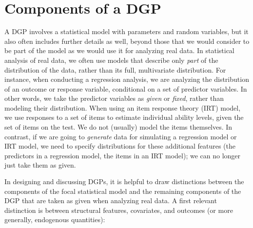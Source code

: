 \documentclass[
]{book}
\begin{document}
\section{Components of a DGP}\label{components-of-a-dgp}

A DGP involves a statistical model with parameters and random variables, but it also often includes further details as well, beyond those that we would consider to be part of the model as we would use it for analyzing real data.
In statistical analysis of real data, we often use models that describe only \emph{part} of the distribution of the data, rather than its full, multivariate distribution.
For instance, when conducting a regression analysis, we are analyzing the distribution of an outcome or response variable, conditional on a set of predictor variables.
In other words, we take the predictor variables as \emph{given} or \emph{fixed}, rather than modeling their distribution.
When using an item response theory (IRT) model, we use responses to a set of items to estimate individual ability levels, given the set of items on the test.
We do not (usually) model the items themselves.
In contrast, if we are going to \emph{generate} data for simulating a regression model or IRT model, we need to specify distributions for these additional features (the predictors in a regression model, the items in an IRT model); we can no longer just take them as given.

In designing and discussing DGPs, it is helpful to draw distinctions between the components of the focal statistical model and the remaining components of the DGP that are taken as given when analyzing real data. A first relevant distinction is between structural features, covariates, and outcomes (or more generally, endogenous quantities):
\end{document}
